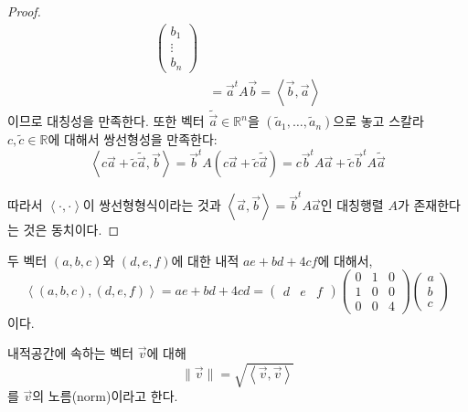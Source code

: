 \documentclass[sections/engineering_mathematics_lecture_note.tex]{subfiles}
\begin{document}
\begin{proof}
\begin{align*}
\begin{pmatrix}
                                        b_1\\
                                        \vdots\\
                                        b_n
                                    \end{pmatrix}\\
                                    &= \vec a^t A \vec b = \left<\vec b, \vec a\right>
    \end{align*}
    이므로 대칭성을 만족한다.
    또한 벡터 $\tilde{\vec a} \in \mathbb R^n$을 $(\tilde a_1, \dots, \tilde a_n)$으로 놓고 스칼라 $c, \tilde c \in \mathbb R$에 대해서 쌍선형성을 만족한다:
    \begin{equation*}
        \left<c \vec a + \tilde c \tilde{\vec a}, \vec b\right> = \vec b^t A (c \vec a + \tilde c \tilde{\vec a}) = c \vec b^t A \vec a + \tilde c \vec b^t A \tilde{\vec a}
    \end{equation*}

    따라서 $\left<\cdot, \cdot\right>$이 쌍선형형식이라는 것과 $\left<\vec a, \vec b\right> = \vec b^t A \vec a$인 대칭행렬 $A$가 존재한다는 것은 동치이다.
\end{proof}

\begin{example}
    두 벡터 $(a, b, c)$와 $(d, e, f)$에 대한 내적 $ae + bd + 4cf$에 대해서,
    \begin{equation*}
        \left<(a, b, c), (d, e, f)\right> = ae + bd + 4cd =
        \begin{pmatrix}
            d & e & f
        \end{pmatrix}
        \begin{pmatrix}
            0 & 1 & 0\\
            1 & 0 & 0\\
            0 & 0 & 4
        \end{pmatrix}
        \begin{pmatrix}
            a \\ b \\ c
        \end{pmatrix}
    \end{equation*}
    이다.
\end{example}

\begin{definition}
    내적공간에 속하는 벡터 $\vec v$에 대해
    \begin{equation*}
        \lVert \vec v \rVert = \sqrt{\left<\vec v, \vec v\right>}
    \end{equation*}
    를 $\vec v$의 노름(norm)이라고 한다.
\end{definition}
\end{document}
